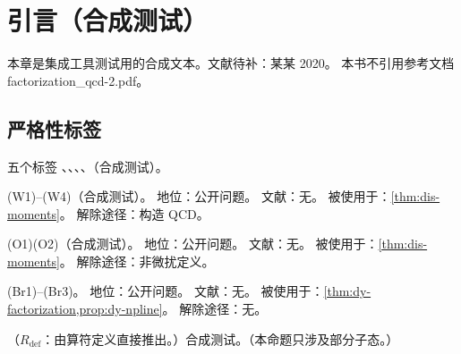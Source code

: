 \chapter{引言（合成测试）}\label{ch:intro}
本章是集成工具测试用的合成文本。文献待补：某某 2020。%
本书不引用参考文档 factorization\_qcd-2.pdf。%

\section{严格性标签}\label{sec:intro-tags}

\begin{definition}[严格性标签]\label{def:intro-tags}
五个标签 \tagR、\tagA、\tagP、\tagC、\tagV（合成测试）。
\end{definition}

\begin{assumption}\label{asm:intro-wightman}
(W1)--(W4)（合成测试）。
地位：公开问题。
文献：无。
被使用于：\cref{thm:dis-moments}。
解除途径：构造 QCD。
\end{assumption}

\begin{assumption}\label{asm:intro-np-ope}
(O1)(O2)（合成测试）。
地位：公开问题。
文献：无。
被使用于：\cref{thm:dis-moments}。
解除途径：非微扰定义。
\end{assumption}

\begin{assumption}\label{asm:intro-bridge}
(Br1)--(Br3)。
地位：公开问题。
文献：无。
被使用于：\cref{thm:dy-factorization,prop:dy-npline}。
解除途径：无。
\end{assumption}

\begin{proposition}\label{prop:intro-algebra}
（$R_{\mathrm{def}}$：由算符定义直接推出。）合成测试。（本命题只涉及部分子态。）
\end{proposition}
